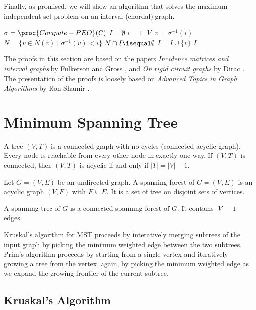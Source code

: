Finally, as promised, we will show an algorithm that solves the maximum independent set problem on an interval (chordal) graph.

\begin{codebox}
    \li $\sigma = \proc{Compute-PEO}(G)$
    \li $I = \emptyset$
    \li \For $i = 1$ \To $|V|$ \Do
        \li $v = \sigma^{-1}(i)$
        \li $N = \{v \in N(v) \mid \sigma^{-1}(v) < i \}$
        \li \If $N \cap I \isequal \emptyset$ \Then
            \li $I = I \cup \{v\}$
        \End
    \End
    \li \Return $I$
\end{codebox}

The proofs in this section are based on the papers \textit{Incidence matrices and interval graphs} by Fulkerson and Gross \cite{Fulkerson1965-Chordal-Graph}, and \textit{On rigid circuit graphs} by Dirac \cite{Dirac1961-Rigid-Circuit-Graph}. The presentation of the proofs is loosely based on \textit{Advanced Topics in Graph Algorithms} by Ron Shamir \cite{shamir}.

\section{Minimum Spanning Tree}

A tree $(V,T)$ is a connected graph with no cycles (connected acyclic graph). Every node is reachable from every other node in exactly one way. If $(V,T)$ is connected, then $(V,T)$ is acyclic if and only if $|T| = |V|-1$.

\begin{definition}  
    Let $G = (V,E)$ be an undirected graph. A spanning forest of $G = (V,E)$ is an acyclic graph $(V,F)$ with $F \subseteq E$. It is a set of tree on disjoint sets of vertices.

    A spanning tree of $G$ is a connected spanning forest of $G$. It contains $|V| - 1$ edges.
\end{definition}

Kruskal's algorithm for MST proceeds by interatively merging subtrees of the input graph by picking the minimum weighted edge between the two subtrees. Prim's algorithm proceeds by starting from a single vertex and iteratively growing a tree from the vertex, again, by picking the minimum weighted edge as we expand the growing frontier of the current subtree.

\subsection{Kruskal's Algorithm} 

